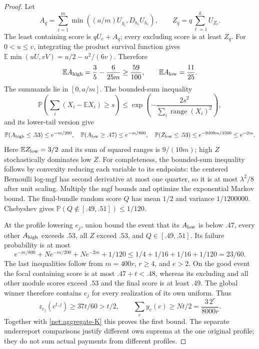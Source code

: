 \documentclass[11pt]{article}
\theoremstyle{definition}\newtheorem{definition}[theorem]{Definition}
\theoremstyle{remark}\newtheorem{remark}[theorem]{Remark}
\newcommand{\E}{\mathbb E}
\newcommand{\Prob}{\mathbb P}
\begin{document}
\begin{proof}
Let
\[
 A_q=\sum_{i=1}^m\min((a/m)U_{y_i},D_{h_i}U_{h_i}),
 \qquad Z_q=q\sum_{\ell=1}^kU_{Z_\ell}.
\]
The least containing score is $qU_e+A_q$; every excluding score is at least
$Z_q$.  For $0<u\le v$, integrating the product survival function gives
$\E\min(uU,vV)=u/2-u^2/(6v)$.  Therefore
\[
 \E A_{\rm high}=\frac35-\frac6{25m}\ge\frac{59}{100},
 \qquad \E A_{\rm low}=\frac{11}{25}.
\]
The summands lie in $[0,a/m]$.  The bounded-sum inequality
\[
 \Prob\!\left(\sum_i(X_i-\E X_i)\ge s\right)
 \le \exp\!\left(-\frac{2s^2}{\sum_i\operatorname{range}(X_i)^2}\right),
\]
and its lower-tail version give
\[
 \Prob(A_{\rm high}\le.53)\le e^{-m/200},\quad
 \Prob(A_{\rm low}\ge.47)\le e^{-m/800},\quad
 \Prob(Z_{\rm low}\le.53)\le e^{-9409m/4500}\le e^{-2m}.
\]
Here $\E Z_{\rm low}=3/2$ and its sum of squared ranges is $9/(10m)$;
high $Z$ stochastically dominates low $Z$.
For completeness, the bounded-sum inequality follows by convexity reducing
each variable to its endpoints: the centered Bernoulli log-mgf has second
derivative at most one quarter, so it is at most $\lambda^2/8$ after unit
scaling.  Multiply the mgf bounds and optimize the exponential Markov bound.
The final-bundle random score $Q$ has mean $1/2$ and variance $1/1200000$.
Chebyshev gives $\Prob(Q\notin[.49,.51])\le1/120$.

At the profile lowering $e_j$, union bound the event that its $A_{\rm low}$
is below $.47$, every other $A_{\rm high}$ exceeds $.53$, all $Z$ exceed
$.53$, and $Q\in[.49,.51]$.  Its failure probability is at most
\[
 e^{-m/800}+Ne^{-m/200}+Ne^{-2m}+1/120
 \le1/4+1/16+1/16+1/120=23/60.
\]
The last inequalities follow from $m=400r$, $r\ge4$, and $e>2$.
On the good event the focal containing score is at most $.47+t<.48$,
whereas its excluding and all other module scores exceed $.53$ and the
final score is at least $.49$.  The global winner therefore contains $e_j$
for every realization of its own uniform.  Thus
\[
 z_{e_j}(c^{t,j})\ge37t/60>t/2,\qquad
 \sum_ey_e(c)\ge Nt/2=\frac{3\,2^r}{8000r}.
\]
Together with \eqref{net:aggregate-K} this proves the first bound.
The separate underreport comparisons justify different own suprema at the
one original profile; they do not sum actual payments from different profiles.


\end{proof}
\end{document}

